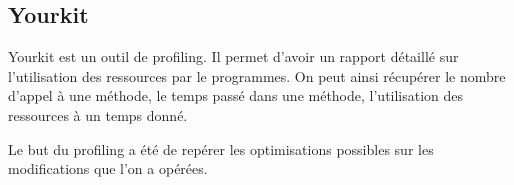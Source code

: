 \subsection{Yourkit}
Yourkit est un outil de profiling. Il permet d'avoir un rapport détaillé sur l'utilisation des ressources par le programmes. On peut ainsi récupérer le nombre d'appel à une méthode, le temps passé dans une méthode, l'utilisation des ressources à un temps donné.

Le but du profiling a été de repérer les optimisations possibles sur les modifications que l'on a opérées.